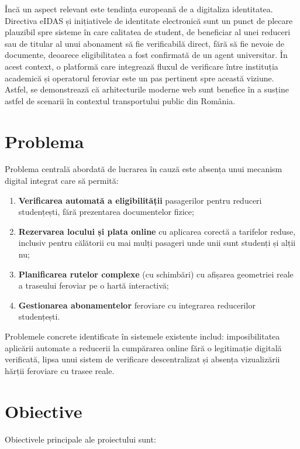 \documentclass[12pt,a4paper]{report}
\begin{document}
Încă un aspect relevant este tendința europeană de a digitaliza identitatea. Directiva eIDAS \cite{jwt2015} și inițiativele de identitate electronică sunt un punct de plecare plauzibil spre sisteme în care calitatea de student, de beneficiar al unei reduceri sau de titular al unui abonament să fie verificabilă direct, fără să fie nevoie de documente, deoarece eligibilitatea a fost confirmată de un agent universitar. În acest context, o platformă care integrează fluxul de verificare între instituția academică și operatorul feroviar este un pas pertinent spre această viziune. Astfel, se demonstrează că arhitecturile moderne web sunt benefice în a susține astfel de scenarii în contextul transportului public din România.


\section{Problema}

Problema centrală abordată de lucrarea în cauză este absența unui mecanism digital integrat care să permită:

\begin{enumerate}
  \item \textbf{Verificarea automată a eligibilității} pasagerilor pentru reduceri studențești, fără prezentarea documentelor fizice;
  \item \textbf{Rezervarea locului și plata online} cu aplicarea corectă a tarifelor reduse, inclusiv pentru călătorii cu mai mulți pasageri unde unii sunt studenți și alții nu;
  \item \textbf{Planificarea rutelor complexe} (cu schimbări) cu afișarea geometriei reale a traseului feroviar pe o hartă interactivă;
  \item \textbf{Gestionarea abonamentelor} feroviare cu integrarea reducerilor studențești.
\end{enumerate}

Problemele concrete identificate în sistemele existente includ: imposibilitatea aplicării automate a reducerii la cumpărarea online fără o legitimație digitală verificată, lipsa unui sistem de verificare descentralizat și absența vizualizării hărții feroviare cu trasee reale.

\section{Obiective}

Obiectivele principale ale proiectului sunt:
\end{document}

